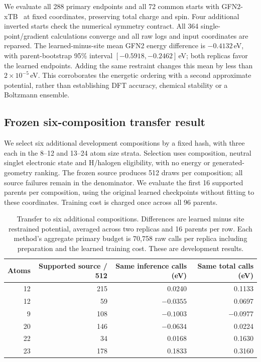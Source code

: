 We evaluate all 288 primary endpoints and all 72 common starts with GFN2-xTB~\citep{gfn2xtb}
at fixed coordinates, preserving total charge and spin. Four additional inverted
starts check the numerical symmetry contract. All 364 single-point/gradient
calculations converge and all raw logs and input coordinates are reparsed.
The learned-minus-site mean GFN2 energy difference is $-0.4132$\,eV, with
parent-bootstrap 95\% interval $[-0.5918,-0.2462]$\,eV; both replicas favor the
learned endpoints. Adding the same restraint changes this mean by less than
$2\times10^{-5}$\,eV. This corroborates the energetic ordering with a second
approximate potential, rather than establishing DFT accuracy, chemical stability
or a Boltzmann ensemble.

\subsection{Frozen six-composition transfer result}

We select six additional development compositions by a fixed hash, with three
each in the 8--12 and 13--24 atom size strata. Selection uses composition,
neutral singlet electronic state and H/halogen eligibility, with no energy or
generated-geometry ranking. The frozen source produces 512 draws per composition;
all source failures remain in the denominator. We evaluate the first 16 supported
parents per composition, using the original learned checkpoints without fitting
to these coordinates. Training cost is charged once across all 96 parents.

\begin{table}[h]
\centering\small
\caption{Transfer to six additional compositions. Differences are learned minus
site restrained potential, averaged across two replicas and 16 parents per row.
Each method's aggregate primary budget is 70,758 raw calls per replica including
preparation and the learned training cost. These are development results.}
\begin{tabular}{rrrr}
\toprule
Atoms & Supported source / 512 & Same inference calls (eV) & Same total calls (eV)\\
\midrule
12 & 215 & 0.0240 & 0.1133\\
12 & 59 & $-0.0355$ & 0.0697\\
9 & 108 & $-0.1003$ & $-0.0977$\\
20 & 146 & $-0.0634$ & 0.0224\\
22 & 34 & 0.0168 & 0.1630\\
23 & 178 & 0.1833 & 0.3160\\
\bottomrule
\end{tabular}
\end{table}

